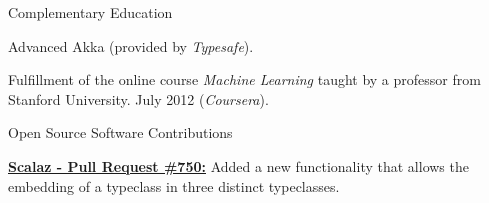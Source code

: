 \documentclass{resume} %
\begin{document}
\begin{rSection}{Complementary Education}
\begin{rSubsection}{}{}{}{}
\item Advanced Akka (provided by \textit{Typesafe}).
\item Fulfillment of the online course \textit{Machine Learning} taught by a professor from Stanford University. July 2012 (\textit{Coursera}).
\end{rSubsection}
\end{rSection}


\begin{rSection}{Open Source Software Contributions}

\begin{rSubsection}{}{}{}{}
\item \textbf{\href{https://github.com/scalaz/scalaz/pull/750}{Scalaz - Pull Request \#750:}} Added a new functionality that allows the embedding of a typeclass in three distinct typeclasses.
\end{rSubsection}

\end{rSection}



\end{document}

